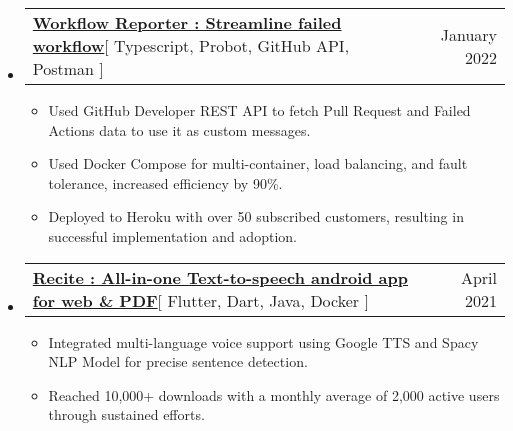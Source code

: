 \documentclass[letterpaper,11pt]{article}
\makeatletter
\newcommand{\resumeItem}[1]{
  \item\small{
    {#1 \vspace{-2pt}}
  }
}
\newcommand{\resumeProjectHeading}[2]{
    \item
    \begin{tabular*}{0.97\textwidth}{l@{\extracolsep{\fill}}r}
      \small#1 & #2 \\
    \end{tabular*}\vspace{-7pt}
}
\newcommand{\resumeSubHeadingListStart}{\begin{itemize}[leftmargin=0.15in, label={}]}
\newcommand{\resumeSubHeadingListEnd}{\end{itemize}}
\newcommand{\resumeItemListStart}{\begin{itemize}}
\newcommand{\resumeItemListEnd}{\end{itemize}\vspace{-5pt}}
\makeatother
\begin{document}
    \resumeSubHeadingListStart
      \resumeProjectHeading
          {\textbf{\href{https://github.com/marketplace/workflow-reporter}{Workflow Reporter : Streamline failed workflow}}{[ Typescript, Probot, GitHub API, Postman ]}}{January 2022}
          \resumeItemListStart
           \resumeItem{Used GitHub Developer REST API to fetch Pull Request and Failed Actions data to use it as custom messages.}
           \resumeItem{Used Docker Compose for multi-container, load balancing, and fault tolerance, increased efficiency by 90\%.}
           \resumeItem{Deployed to Heroku with over 50 subscribed customers, resulting in successful implementation and adoption.}
          \resumeItemListEnd
    \resumeSubHeadingListEnd


    \resumeSubHeadingListStart
      \resumeProjectHeading
          {\textbf{\href{https://play.google.com/store/apps/details?id=com.hackthedeveloper.recite}{Recite : All-in-one Text-to-speech android app for web \& PDF}}{[ Flutter, Dart, Java, Docker ]}}{April 2021}
          \resumeItemListStart
           \resumeItem{Integrated multi-language voice support using Google TTS and Spacy NLP Model for precise sentence detection.}
           \resumeItem{Reached 10,000+ downloads with a monthly average of 2,000 active users through sustained efforts.}
          \resumeItemListEnd
    \resumeSubHeadingListEnd

\end{document}
